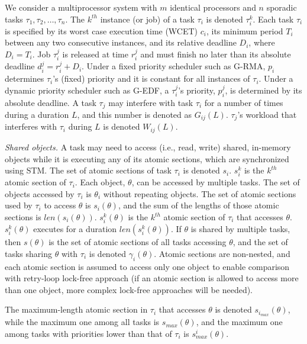 \documentclass{sig-alternate}
\begin{document}
We consider a multiprocessor system with $m$ identical processors and $n$ sporadic tasks $\tau_1, \tau_2,\ldots, \tau_n$. The $k^{th}$ instance (or job) of a task $\tau_i$ is denoted $\tau_i^k$. Each task $\tau_i$ is specified by its worst case execution time (WCET) $c_i$, its minimum period $T_i$ between any two consecutive instances, and its relative deadline $D_i$, where $D_i=T_i$. Job $\tau_i^j$ is released at time $r_i^j$ and must finish no later than its absolute deadline $d_i^j=r_i^j+D_i$. Under a fixed priority scheduler such as G-RMA, $p_i$ determines $\tau_i$'s (fixed) priority and it is constant for all instances of $\tau_i$. Under a dynamic priority scheduler such as G-EDF, a $\tau_i^j$'s priority, $p_i^j$, is determined by its absolute deadline. 
A task $\tau_j$ may interfere with task $\tau_i$ for a number of times during a duration $L$, and this number is denoted as $G_{ij}(L)$. 
$\tau_j$'s workload that interferes with $\tau_i$ during $L$ is denoted $W_{ij}(L)$.


\textit{Shared objects.} A task may need to access (i.e., read, write) shared, in-memory objects while it is executing any of its atomic sections, which are synchronized using STM. 
The set of atomic sections of task $\tau_i$ is denoted $s_i$. $s_i^k$ is the $k^{th}$ atomic section of $\tau_i$. 
Each object, $\theta$, can be accessed by multiple tasks. The set of objects accessed by $\tau_i$ is $\theta_i$ without repeating objects.
The set of atomic sections used by $\tau_i$ to access $\theta$ is $s_i(\theta)$, and the sum of the lengths of those atomic sections is $len(s_i(\theta))$. $s_i^k(\theta)$ is the $k^{th}$ atomic section of $\tau_i$ that accesses $\theta$. $s_i^k(\theta)$  executes for a duration $len(s_i^k(\theta))$.
If $\theta$ is shared by multiple tasks, then $s(\theta)$ is the set of atomic sections of all tasks accessing $\theta$, and the set of tasks sharing $\theta$ with $\tau_i$ is denoted $\gamma_i(\theta)$. Atomic sections are non-nested, and each atomic section is assumed to access only one object to enable comparison with retry-loop lock-free approach \cite{key-5} (if an atomic section is allowed to access more than one object, more complex lock-free approaches will be needed).

The maximum-length atomic section in $\tau_i$ that accesses $\theta$ is denoted $s_{i_{max}} (\theta)$, while the maximum one among all tasks is $s_{max} (\theta)$, and the maximum one among tasks with priorities lower than that of $\tau_i$ is $s_{max}^i (\theta)$.
\end{document}
